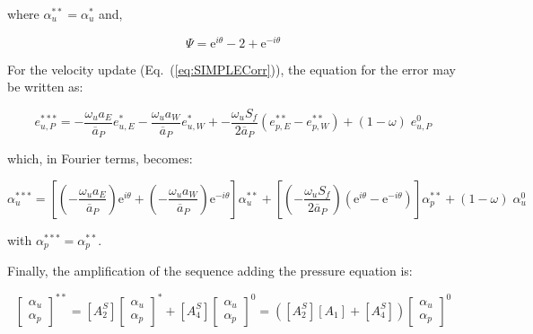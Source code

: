\documentclass[final,3p,times,11pt,onecolumn]{myElsarticle}
\numberwithin{equation}{section}
\begin{document}
\noindent where $\alpha_u^{**} = \alpha_u^{*}$ and,

\begin{equation}
    \Psi = \text{e}^{i \theta} - 2 + \text{e}^{- i \theta}
\end{equation}

For the velocity update (Eq.~(\ref{eq:SIMPLECorr})), the equation for the error may be written as:

\begin{equation}
    e_{u,P}^{***} = -\dfrac{\omega_u a_E}{\overline{a}_P} e_{u,E}^{*} -\dfrac{\omega_u a_W}{\overline{a}_P} e_{u,W}^{*} +
                   -\dfrac{\omega_u S_f}{2 \overline{a}_P} (e_{p,E}^{**}-e_{p,W}^{**}) +
                   (1-\omega) \; e_{u,P}^0
\end{equation}

\noindent which, in Fourier terms, becomes:

\begin{equation}
    \alpha_{u}^{***} = \left[\left(-\dfrac{\omega_u a_E}{\overline{a}_P}\right) \text{e}^{i \theta} + \left(- \dfrac{\omega_u a_W}{\overline{a}_P}\right) \text{e}^{- i \theta}\right] \alpha_u^{**} +
                   \left[\left(-\dfrac{\omega_u S_f}{2 \overline{a}_P}\right) \left(\text{e}^{i \theta}-\text{e}^{-i \theta}\right) \right] \alpha_p^{**} +
                   (1-\omega) \; \alpha_u^0
\end{equation}

\noindent with $\alpha_p^{***}=\alpha_p^{**}$.

Finally, the amplification of the sequence adding the pressure equation is:

\begin{equation}
\begin{bmatrix}
\alpha_u \\
\alpha_p 
\end{bmatrix}^{**} =
[A^S_2]
\begin{bmatrix}
\alpha_u \\
\alpha_p 
\end{bmatrix}^{*} +
[A^S_4]
\begin{bmatrix}
\alpha_u \\
\alpha_p 
\end{bmatrix}^{0} =
([A^S_2] [A_1] + [A^S_4])
\begin{bmatrix}
\alpha_u \\
\alpha_p 
\end{bmatrix}^{0}
\end{equation}
\end{document}

